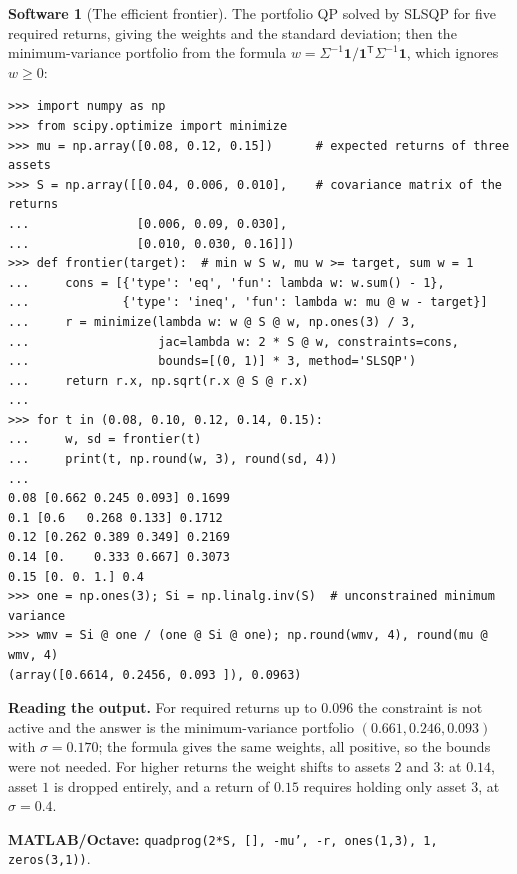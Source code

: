 \documentclass[11pt,a4paper]{article}
\numberwithin{equation}{section}
\theoremstyle{definition}
\newtheorem{software}[thm]{Software}
\begin{document}
\begin{software}[The efficient frontier]
\label{sw:portfolio}
The portfolio QP solved by SLSQP for five required returns, giving the weights and the standard deviation; then the minimum-variance portfolio from the formula $w = \Sigma^{-1}\mathbf 1/\mathbf 1^{\mathsf T}\Sigma^{-1}\mathbf 1$, which ignores $w \geq 0$:
{\small\begin{verbatim}
>>> import numpy as np
>>> from scipy.optimize import minimize
>>> mu = np.array([0.08, 0.12, 0.15])      # expected returns of three assets
>>> S = np.array([[0.04, 0.006, 0.010],    # covariance matrix of the returns
...               [0.006, 0.09, 0.030],
...               [0.010, 0.030, 0.16]])
>>> def frontier(target):  # min w S w, mu w >= target, sum w = 1
...     cons = [{'type': 'eq', 'fun': lambda w: w.sum() - 1},
...             {'type': 'ineq', 'fun': lambda w: mu @ w - target}]
...     r = minimize(lambda w: w @ S @ w, np.ones(3) / 3,
...                  jac=lambda w: 2 * S @ w, constraints=cons,
...                  bounds=[(0, 1)] * 3, method='SLSQP')
...     return r.x, np.sqrt(r.x @ S @ r.x)
...
>>> for t in (0.08, 0.10, 0.12, 0.14, 0.15):
...     w, sd = frontier(t)
...     print(t, np.round(w, 3), round(sd, 4))
...
0.08 [0.662 0.245 0.093] 0.1699
0.1 [0.6   0.268 0.133] 0.1712
0.12 [0.262 0.389 0.349] 0.2169
0.14 [0.    0.333 0.667] 0.3073
0.15 [0. 0. 1.] 0.4
>>> one = np.ones(3); Si = np.linalg.inv(S)  # unconstrained minimum variance
>>> wmv = Si @ one / (one @ Si @ one); np.round(wmv, 4), round(mu @ wmv, 4)
(array([0.6614, 0.2456, 0.093 ]), 0.0963)
\end{verbatim}}
\textbf{Reading the output.} For required returns up to $0.096$ the constraint is not active and the answer is the minimum-variance portfolio $(0.661, 0.246, 0.093)$ with $\sigma = 0.170$; the formula gives the same weights, all positive, so the bounds were not needed. For higher returns the weight shifts to assets $2$ and $3$: at
$0.14$, asset $1$ is dropped entirely, and a return of $0.15$ requires holding only asset $3$, at $\sigma = 0.4$.

\textbf{MATLAB/Octave:} \texttt{quadprog(2*S, [], -mu', -r, ones(1,3), 1, zeros(3,1))}.
\end{software}
\end{document}
